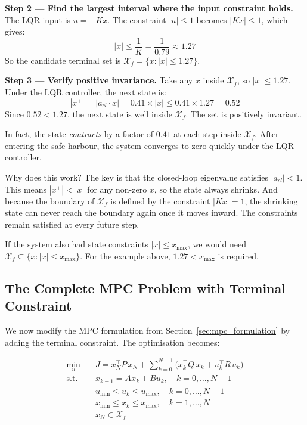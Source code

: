 \textbf{Step 2 --- Find the largest interval where the input constraint holds.}
The LQR input is $u = -Kx$. The constraint $|u| \le 1$ becomes $|Kx| \le 1$, which gives:
\[
|x| \le \frac{1}{K} = \frac{1}{0.79} \approx 1.27
\]
So the candidate terminal set is $\mathcal{X}_f = \{x : |x| \le 1.27\}$.

\textbf{Step 3 --- Verify positive invariance.}
Take any $x$ inside $\mathcal{X}_f$, so $|x| \le 1.27$. Under the LQR controller, the next state is:
\[
|x^+| = |a_{cl} \cdot x| = 0.41 \times |x| \le 0.41 \times 1.27 = 0.52
\]
Since $0.52 < 1.27$, the next state is well inside $\mathcal{X}_f$. The set is positively invariant.

In fact, the state \textit{contracts} by a factor of $0.41$ at each step inside $\mathcal{X}_f$. After entering the safe harbour, the system converges to zero quickly under the LQR controller.

\begin{notebox}{Why does this work?}
	The key is that the closed-loop eigenvalue satisfies $|a_{cl}| < 1$. This means $|x^+| < |x|$ for any non-zero $x$, so the state always shrinks. And because the boundary of $\mathcal{X}_f$ is defined by the constraint $|Kx| = 1$, the shrinking state can never reach the boundary again once it moves inward. The constraints remain satisfied at every future step.

	If the system also had state constraints $|x| \le x_{\max}$, we would need $\mathcal{X}_f \subseteq \{x : |x| \le x_{\max}\}$. For the example above, $1.27 < x_{\max}$ is required.
\end{notebox}

\subsection{The Complete MPC Problem with Terminal Constraint}

We now modify the MPC formulation from Section~\ref{sec:mpc_formulation} by adding the terminal constraint. The optimisation becomes:

\begin{align*}
	\min_{u} \quad & J = x_N^\top P\, x_N + \sum_{k=0}^{N-1} \bigl(x_k^\top Q\, x_k + u_k^\top R\, u_k\bigr) \\
	\text{s.t.} \quad & x_{k+1} = Ax_k + Bu_k, \quad k = 0, \ldots, N-1 \\
	& u_{\min} \le u_k \le u_{\max}, \quad k = 0, \ldots, N-1 \\
	& x_{\min} \le x_k \le x_{\max}, \quad k = 1, \ldots, N \\
	& {x_N \in \mathcal{X}_f}
\end{align*}

